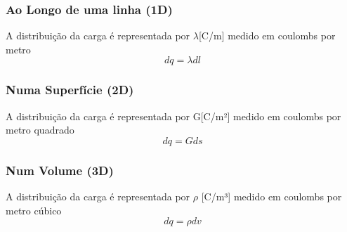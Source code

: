 \documentclass[a4paper]{article}
\begin{document}
\subsubsection{Ao Longo de uma linha (1D)}
A distribuição da carga é representada por $\lambda$[C/m] medido em coulombs por metro
\[dq = \lambda dl\]

\subsubsection{Numa Superfície (2D)}
A distribuição da carga é representada por G[C/m²] medido em coulombs por metro quadrado
\[dq = Gds\]

\subsubsection{Num Volume (3D)}
A distribuição da carga é representada por $\rho$ [C/m³] medido em coulombs por metro cúbico
\[dq = \rho dv\]
\end{document}
